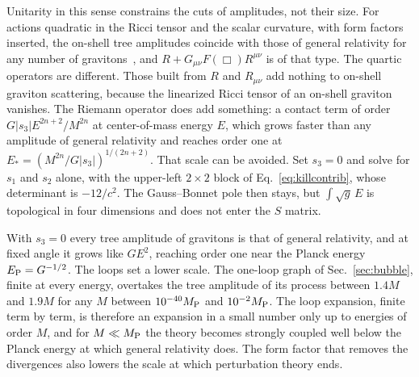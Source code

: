 \documentclass[aps,prd,10pt,twocolumn,superscriptaddress,nofootinbib,floatfix,longbibliography]{revtex4-2}
\begin{document}
Unitarity in this sense constrains the cuts of amplitudes, not their size. For actions quadratic in the Ricci tensor and the scalar curvature, with form factors inserted, the on-shell tree amplitudes coincide with those of general relativity for any number of gravitons~\cite{Dona2015}, and $R+G_{\mu\nu}F(\Box)R^{\mu\nu}$ is of that type. The quartic operators are different. Those built from $R$ and $R_{\mu\nu}$ add nothing to on-shell graviton scattering, because the linearized Ricci tensor of an on-shell graviton vanishes. The Riemann operator does add something: a contact term of order $G|s_3|E^{2n+2}/M^{2n}$ at center-of-mass energy $E$, which grows faster than any amplitude of general relativity and reaches order one at $E_*=(M^{2n}/G|s_3|)^{1/(2n+2)}$. That scale can be avoided. Set $s_3=0$ and solve for $s_1$ and $s_2$ alone, with the upper-left $2\times2$ block of Eq.~\eqref{eq:killcontrib}, whose determinant is $-12/c^2$. The Gauss--Bonnet pole then stays, but $\int\sqrt g\,E$ is topological in four dimensions and does not enter the $S$ matrix.

With $s_3=0$ every tree amplitude of gravitons is that of general relativity, and at fixed angle it grows like $GE^2$, reaching order one near the Planck energy $E_{\rm P}=G^{-1/2}$. The loops set a lower scale. The one-loop graph of Sec.~\ref{sec:bubble}, finite at every energy, overtakes the tree amplitude of its process between $1.4M$ and $1.9M$ for any $M$ between $10^{-40}M_{\rm P}$ and $10^{-2}M_{\rm P}$. The loop expansion, finite term by term, is therefore an expansion in a small number only up to energies of order $M$, and for $M\ll M_{\rm P}$ the theory becomes strongly coupled well below the Planck energy at which general relativity does. The form factor that removes the divergences also lowers the scale at which perturbation theory ends.
\end{document}
